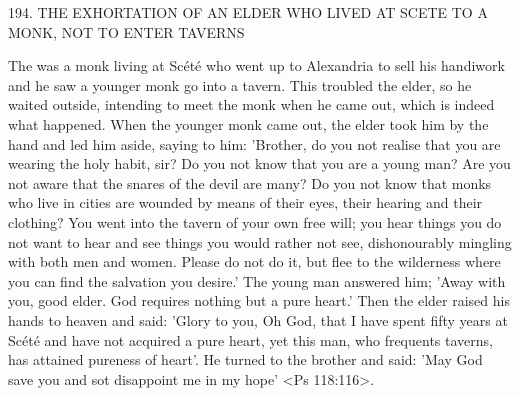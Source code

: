194.
THE EXHORTATION OF AN ELDER
WHO LIVED AT SCETE TO A MONK,
NOT TO ENTER TAVERNS

The was a monk living at Scété who went up to Alexandria to sell
his handiwork and he saw a younger monk go into a tavern.
This
troubled the elder, so he waited outside, intending to meet the monk
when he came out, which is indeed what happened.
When the
younger monk came out, the elder took him by the hand and led
him aside, saying to him: 'Brother, do you not realise that you are
wearing the holy habit, sir? Do you not know that you are a young
man? Are you not aware that the snares of the devil are many? Do
you not know that monks who live in cities are wounded by means
of their eyes, their hearing and their clothing? You went into the
tavern of your own free will; you hear things you do not want to
hear and see things you would rather not see, dishonourably
mingling with both men and women.
Please do not do it, but flee to
the wilderness where you can find the salvation you desire.' The
young man answered him; 'Away with you, good elder.
God
requires nothing but a pure heart.' Then the elder raised his hands
to heaven and said: 'Glory to you, Oh God, that I have spent fifty
years at Scété and have not acquired a pure heart, yet this man,
who frequents taverns, has attained pureness of heart'.
He turned to
the brother and said: 'May God save you and sot disappoint me in
my hope' <Ps 118:116>.


